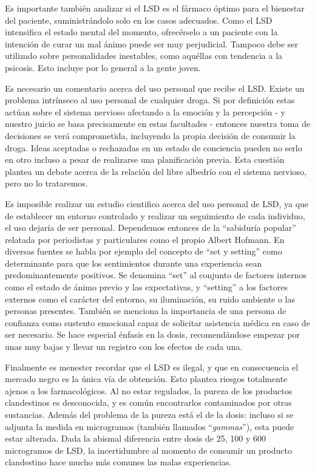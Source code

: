 Es importante también analizar si el LSD es el fármaco óptimo para el bienestar del paciente, suministrándolo solo en los casos adecuados. Como el LSD intensifica el estado mental del momento, ofrecérselo a un paciente con la intención de curar un mal ánimo puede ser muy perjudicial. Tampoco debe ser utilizado sobre personalidades inestables, como aquéllas con tendencia a la psicosis. Esto incluye por lo general a la gente joven.

Es necesario un comentario acerca del uso personal que recibe el LSD. Existe un problema intrínseco al uso personal de cualquier droga. Si por definición estas actúan sobre el sistema nervioso afectando a la emoción y la percepción - y nuestro juicio se basa precisamente en estas facultades - entonces nuestra toma de decisiones se verá comprometida, incluyendo la propia decisión de consumir la droga. Ideas aceptadas o rechazadas en un estado de conciencia pueden no serlo en otro incluso a pesar de realizarse una planificación previa. Esta cuestión plantea un debate acerca de la relación del libre albedrío con el sistema nervioso, pero no lo trataremos.

Es imposible realizar un estudio cientifico acerca del uso personal de LSD, ya que de establecer un entorno controlado y realizar un seguimiento de cada individuo, el uso dejaría de ser personal. Dependemos entonces de la \enquote{sabiduría popular} relatada por periodistas y particulares como el propio Albert Hofmann. En diversas fuentes se habla por ejemplo del concepto de \enquote{set y setting} como determinante para que los sentimientos durante una experiencia sean predominantemente positivos. Se denomina \enquote{set} al conjunto de factores internos como el estado de ánimo previo y las expectativas, y \enquote{setting} a los factores externos como el carácter del entorno, su iluminación, su ruido ambiente o las personas presentes. También se menciona la importancia de una persona de confianza como sustento emocional capaz de solicitar asistencia médica en caso de ser necesario. Se hace especial énfasis en la dosis, recomendándose empezar por unas muy bajas y llevar un registro con los efectos de cada una.

Finalmente es menester recordar que el LSD es ilegal, y que en consecuencia el mercado negro es la única vía de obtención. Esto plantea riesgos totalmente ajenos a los farmacológicos. Al no estar regulados, la pureza de los productos clandestinos es desconocida, y es común encontrarlos contaminados por otras sustancias. Además del problema de la pureza está el de la dosis: incluso si se adjunta la medida en microgramos (también llamados \enquote{\textit{gammas}}), esta puede estar alterada. Dada la abismal diferencia entre dosis de 25, 100 y 600 microgramos de LSD, la incertidumbre al momento de consumir un producto clandestino hace mucho más comunes las malas experiencias.
